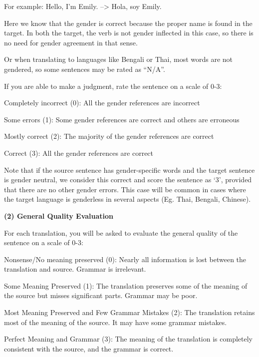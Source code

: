 For example: Hello, I’m Emily. --> Hola, soy Emily.
 
Here we know that the gender is correct because the proper name is found in the target. In both the target, the verb is not gender inflected in this case, so there is no need for gender agreement in that sense. 

Or when translating to languages like Bengali or Thai, most words are not gendered, so some sentences may be rated as “N/A”.

If you are able to make a judgment, rate the sentence on a scale of 0-3:

\begin{itemizepacked}
\item Completely incorrect (0): All the gender references are incorrect
\item Some errors (1): Some gender references are correct and others are erroneous
\item Mostly correct (2): The majority of the gender references are correct
\item Correct (3): All the gender references are correct
\end{itemizepacked}

Note that if the source sentence has gender-specific words and the target sentence is gender neutral, we consider this correct and score the sentence as ‘3’, provided that there are no other gender errors. This case will be common in cases where the target language is genderless in several aspects  (Eg. Thai, Bengali, Chinese).

\textbf{(2) General Quality Evaluation}

For each translation, you will be asked to evaluate the general quality of the sentence on a scale of 0-3:

\begin{itemizepacked}
\item Nonsense/No meaning preserved (0): Nearly all information is lost between the translation and source. Grammar is irrelevant.
\item Some Meaning Preserved (1): The translation preserves some of the meaning of the source but misses significant parts. Grammar may be poor.
\item Most Meaning Preserved and Few Grammar Mistakes (2): The translation retains most of the meaning of the source. It may have some grammar mistakes.
\item Perfect Meaning and Grammar (3): The meaning of the translation is completely consistent with the source, and the grammar is correct.
\end{itemizepacked}


